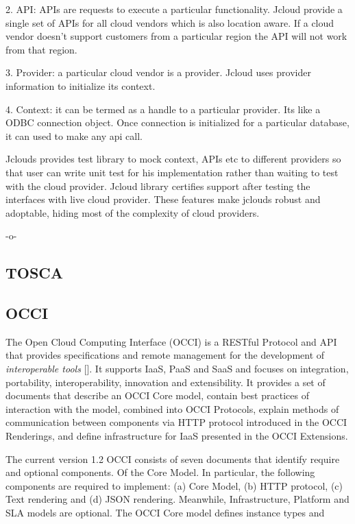      2. API: APIs are requests to execute a particular
        functionality. Jcloud provide a single set of APIs for all
        cloud vendors which is also location aware. If a cloud vendor
        doesn't support customers from a particular region the API
        will not work from that region.

     3. Provider: a particular cloud vendor is a provider. Jcloud uses
        provider information to initialize its context.

     4. Context: it can be termed as a handle to a particular
        provider. Its like a ODBC connection object. Once connection
        is initialized for a particular database, it can used to make
        any api call.

        Jclouds provides test library to mock context, APIs etc to
        different providers so that user can write unit test for his
        implementation rather than waiting to test with the cloud
        provider. Jcloud library certifies support after testing the
        interfaces with live cloud provider. These features make
        jclouds robust and adoptable, hiding most of the complexity of
        cloud providers.

        -o-

\subsection{TOSCA}


\subsection{OCCI}

The Open Cloud Computing Interface (OCCI) is a RESTful Protocol and
API that provides specifications and remote management for the
development of \textit{interoperable tools} [\cite{www-occi}]. It
supports IaaS, PaaS and SaaS and focuses on integration, portability,
interoperability, innovation and extensibility. It provides a set of
documents that describe an OCCI Core model, contain best practices of
interaction with the model, combined into OCCI Protocols, explain
methods of communication between components via HTTP protocol
introduced in the OCCI Renderings, and define infrastructure for IaaS
presented in the OCCI Extensions.

The current version 1.2 OCCI consists of seven documents that identify
require and optional components. Of the Core Model.  In particular,
the following components are required to implement: (a) Core Model,
(b) HTTP protocol, (c) Text rendering and (d) JSON
rendering. Meanwhile, Infrastructure, Platform and SLA models are
optional.  The OCCI Core model defines instance types and

